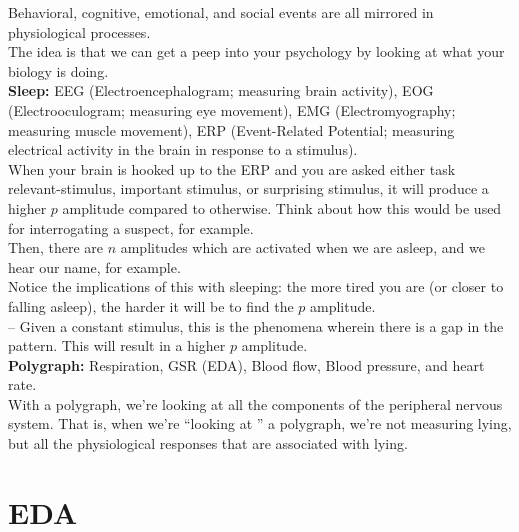  Behavioral, cognitive, emotional, and social events are all mirrored in physiological processes. \\

The idea is that we can get a peep into your psychology by looking at what your biology is doing. \\

\textbf{Sleep:} EEG (Electroencephalogram; measuring brain activity), EOG (Electrooculogram; measuring eye movement), EMG (Electromyography; measuring muscle movement), ERP (Event-Related Potential; measuring electrical activity in the brain in response to a stimulus). \\ 

When your brain is hooked up to the ERP and you are asked either task relevant-stimulus, important stimulus, or surprising stimulus, it will produce a higher \(p\) amplitude compared to otherwise. Think about how this would be used for interrogating a suspect, for example. \\ 

Then, there are \(n\) amplitudes which are activated when we are asleep, and we hear our name, for example. \\

Notice the implications of this with sleeping: the more tired you are (or closer to falling asleep), the harder it will be to find the \(p\) amplitude. \\

 -- Given a constant stimulus, this is the phenomena wherein there is a gap in the pattern. This will result in a higher \(p\) amplitude. \\

\textbf{Polygraph:} Respiration, GSR (EDA), Blood flow, Blood pressure, and heart rate. \\

With a polygraph, we're looking at all the components of the peripheral nervous system. That is, when we're ``looking at  '' a polygraph, we're not measuring lying, but all the physiological responses that are associated with lying. \\



\section*{EDA}

